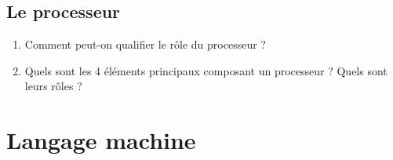 \documentclass[11pt,a4paper]{article}
\begin{document}
\subsection*{Le processeur}

\begin{enumerate}
\item Comment peut-on qualifier le rôle du processeur ?\vspace{2cm}
\item Quels sont les 4 éléments principaux composant un processeur ? Quels sont leurs rôles ?\vspace{10cm}
\end{enumerate}





\newpage
\section{Langage machine}
\end{document}
